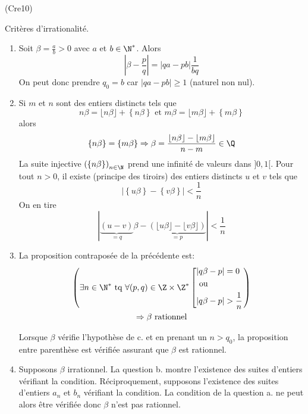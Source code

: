 \begin{tiny}(Cre10)\end{tiny} Critères d'irrationalité.
\begin{enumerate}
  \item Soit $\beta= \frac{a}{b}>0$ avec $a$ et $b\in\N^*$. Alors
\begin{displaymath}
  \left| \beta - \frac{p}{q}\right| = |qa - pb|\frac{1}{bq}
\end{displaymath}
On peut donc prendre $q_0=b$ car $|qa-pb|\geq1$ (naturel non nul).

  \item Si $m$ et $n$ sont des entiers distincts tels que
\begin{displaymath}
n\beta = \lfloor n\beta\rfloor + \left\lbrace n\beta \right\rbrace  \text{ et }
m\beta = \lfloor m\beta\rfloor + \left\lbrace m\beta \right\rbrace
\end{displaymath}
alors
\begin{displaymath}
\left\lbrace n\beta \right\rbrace = \left\lbrace m\beta \right\rbrace \Rightarrow
\beta = \frac{\lfloor n\beta\rfloor - \lfloor m\beta\rfloor}{n-m} \in \Q
\end{displaymath}
La suite injective $\left( \left\lbrace n\beta \right\rbrace\right)_{n\in \N}$ prend une infinité de valeurs dans $]0,1[$. Pour tout $n>0$, il existe (principe des tiroirs) des entiers distincts $u$ et $v$ tels que 
\begin{displaymath}
  \left|\left\lbrace u\beta \right\rbrace - \left\lbrace v\beta \right\rbrace \right| < \frac{1}{n}
\end{displaymath}
On en tire
\begin{displaymath}
  \left|\underset{=q}{\underbrace{(u-v)}}\beta - 
  \underset{=p}{\underbrace{\left( \lfloor u\beta\rfloor  - \lfloor v\beta\rfloor \right)}}  \right| < \frac{1}{n}
\end{displaymath}

  \item La proposition contraposée de la précédente est:
\begin{multline*}
\left( \exists n \in \N^* \text{ tq }\forall (p,q)\in \Z\times \Z^*
\left[ 
\begin{aligned}
  &|q\beta -p| = 0 \\ &\text{ ou } \\ &|q\beta -p|>\frac{1}{n}
\end{aligned}
\right. \right) \\
\Rightarrow   \beta \text{ rationnel}
\end{multline*}

Lorsque $\beta$ vérifie l'hypothèse de c. et en prenant un $n>q_0$, la proposition entre parenthèse est vérifiée assurant que $\beta$ est rationnel.
  
  \item Supposons $\beta$ irrationnel. La question b. montre l'existence des suites d'entiers vérifiant la condition.\newline
Réciproquement, supposons l'existence des suites d'entiers $a_n$ et $b_n$ vérifiant la condition. La condition de la question a. ne peut alors être vérifiée donc $\beta$ n'est pas rationnel.
\end{enumerate}
